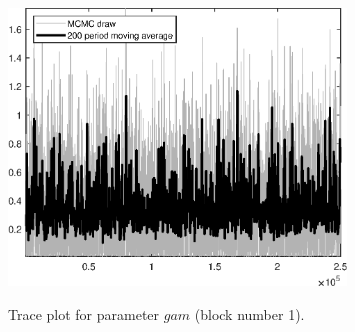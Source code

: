 \begin{figure}[H]
\centering
  \includegraphics[width=0.8\textwidth]{directed_search_est_alt_obs/graphs/TracePlot_gam_blck_1}\\
    \caption{Trace plot for parameter $gam$ (block number 1).}
\end{figure}
